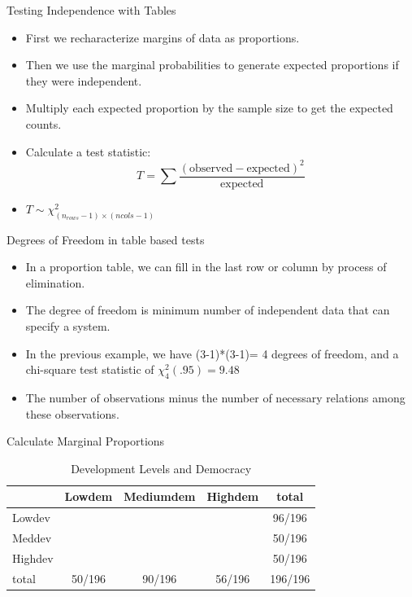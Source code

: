 \documentclass{beamer}
\numberwithin{equation}{section}
\begin{document}
\begin{frame}{Testing Independence with Tables}
\begin{itemize}
\item First we recharacterize margins of data as proportions.\pause
\item Then we use the marginal probabilities to generate expected proportions if they were independent.\pause
\item Multiply each expected proportion by the sample size to get the expected counts.\pause
\item Calculate a test statistic:
$$T=\sum\frac{(\text{observed}-\text{expected})^2}{\text{expected}}$$\pause
\item $T\sim \chi^2_{(n_{rows}-1)\times(ncols-1)}$
\end{itemize}
\end{frame}



\begin{frame}{Degrees of Freedom in table based tests}
\begin{itemize}
\item In a proportion table, we can fill in the last row or column by process of elimination.\pause
\item  The degree of freedom is minimum number of independent data that can specify a system.\pause
\item In the previous example, we have (3-1)*(3-1)= 4 degrees of freedom, and a chi-square test statistic of $\chi^2_4(.95)=9.48$
\item The number of observations minus the number of necessary relations among these observations.
\end{itemize}
\end{frame}

\begin{frame}{Calculate Marginal Proportions}
\begin{table}[htdp]
\caption{Development Levels and Democracy}
\begin{center}
\begin{tabular}{l|ccc|c}
\hline
&Lowdem &Mediumdem &Highdem &total\\
\hline
Lowdev& && &96/196\\
Meddev&&& & 50/196\\
Highdev && && 50/196\\
\hline 
total &50/196& 90/196& 56/196& 196/196
\end{tabular}
\end{center}
\end{table}
\end{frame}
\end{document}
